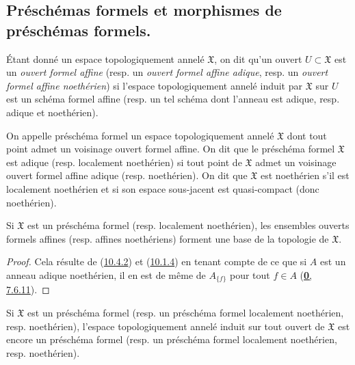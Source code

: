 \subsection{Préschémas formels et morphismes de préschémas formels.}
\label{subsection:I.10.4-fr}

\begin{env}[10.4.1.]
\label{I.10.4.1-fr}
Étant donné un espace topologiquement annelé $\mathfrak{X}$, on dit qu'un
ouvert $U\subset\mathfrak{X}$ est un \emph{ouvert formel affine} (resp. un
\emph{ouvert formel affine adique}, resp. un \emph{ouvert formel affine
noethérien}) si l'espace topologiquement annelé induit par $\mathfrak{X}$
sur $U$ est un schéma formel affine (resp. un tel schéma dont l'anneau est
adique, resp. adique et noethérien).
\end{env}

\begin{definition}[10.4.2]
\label{I.10.4.2-fr}
On appelle préschéma formel un espace topologiquement annelé $\mathfrak{X}$
dont tout point admet un voisinage ouvert formel affine. On dit que le
préschéma formel $\mathfrak{X}$ est adique \textup{(resp.} localement noethérien) si
tout point de $\mathfrak{X}$ admet un voisinage ouvert formel affine adique
\textup{(resp.} noethérien). On dit que $\mathfrak{X}$ est noethérien s'il est
localement noethérien et si son espace sous-jacent est quasi-compact (donc
noethérien).
\end{definition}

\begin{proposition}[10.4.3]
\label{I.10.4.3-fr}
Si $\mathfrak{X}$ est un préschéma formel \textup{(resp.} localement noethérien),
les ensembles ouverts formels affines \textup{(resp.} affines noethériens) forment
une base de la topologie de $\mathfrak{X}$.
\end{proposition}

\begin{proof}
Cela résulte de (\hyperref[I.10.4.2-fr]{10.4.2}) et
(\hyperref[I.10.1.4-fr]{10.1.4}) en tenant compte de ce que si $A$ est un
anneau adique noethérien, il en est de même de $A_{\{f\}}$ pour tout
$f\in A$ (\hyperref[0.7.6.11-fr]{\textbf{0}, 7.6.11}).
\end{proof}

\begin{corollary}[10.4.4]
\label{I.10.4.4-fr}
Si $\mathfrak{X}$ est un préschéma formel \textup{(resp.} un préschéma formel
localement noethérien, \textup{resp.} noethérien), l'espace topologiquement annelé
induit sur tout ouvert de $\mathfrak{X}$ est encore un préschéma formel
\textup{(resp.} un préschéma formel localement noethérien, \textup{resp.} noethérien).
\end{corollary}

